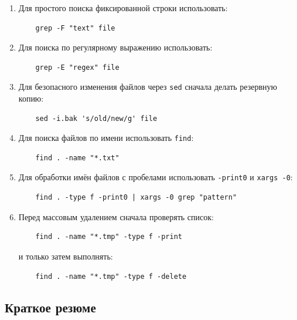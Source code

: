 \documentclass[12pt,a4paper]{article}
\begin{document}
\begin{enumerate}
    \item Для простого поиска фиксированной строки использовать:
    \begin{verbatim}
    grep -F "text" file
    \end{verbatim}

    \item Для поиска по регулярному выражению использовать:
    \begin{verbatim}
    grep -E "regex" file
    \end{verbatim}

    \item Для безопасного изменения файлов через \texttt{sed} сначала делать резервную копию:
    \begin{verbatim}
    sed -i.bak 's/old/new/g' file
    \end{verbatim}

    \item Для поиска файлов по имени использовать \texttt{find}:
    \begin{verbatim}
    find . -name "*.txt"
    \end{verbatim}

    \item Для обработки имён файлов с пробелами использовать \texttt{-print0} и \texttt{xargs -0}:
    \begin{verbatim}
    find . -type f -print0 | xargs -0 grep "pattern"
    \end{verbatim}

    \item Перед массовым удалением сначала проверять список:
    \begin{verbatim}
    find . -name "*.tmp" -type f -print
    \end{verbatim}

    и только затем выполнять:
    \begin{verbatim}
    find . -name "*.tmp" -type f -delete
    \end{verbatim}
\end{enumerate}

\subsection{Краткое резюме}
\end{document}
